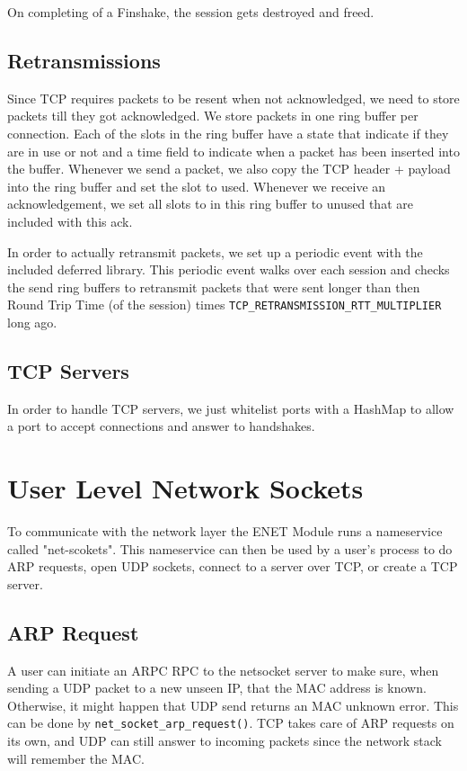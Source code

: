 On completing of a Finshake, the session gets destroyed and freed.

\subsection{Retransmissions}

Since TCP requires packets to be resent when not acknowledged, we need to store packets till they got acknowledged. We store packets in one ring buffer per connection. Each of the slots in the ring buffer have a state that indicate if they are in use or not and a time field to indicate when a packet has been inserted into the buffer. Whenever we send a packet, we also copy the TCP header + payload into the ring buffer and set the slot to used. Whenever we receive an acknowledgement, we set all slots to in this ring buffer to unused that are included with this ack. 

In order to actually retransmit packets, we set up a periodic event with the included deferred library. This periodic event walks over each session and checks the send ring buffers to retransmit packets that were sent longer than then Round Trip Time (of the session) times \texttt{TCP_RETRANSMISSION_RTT_MULTIPLIER} long ago.

\subsection{TCP Servers}
In order to handle TCP servers, we just whitelist ports with a HashMap to allow a port to accept connections and answer to handshakes.



\section{User Level Network Sockets}

To communicate with the network layer the ENET Module runs a nameservice called "net-scokets". This nameservice can then be used by a user's process to do ARP requests, open UDP sockets, connect to a server over TCP, or create a TCP server.  

\subsection{ARP Request}

A user can initiate an ARPC RPC to the netsocket server to make sure, when sending a UDP packet to a new unseen IP, that the MAC address is known. Otherwise, it might happen that UDP send returns an MAC unknown error. This can be done by \texttt{net_socket_arp_request()}. TCP takes care of ARP requests on its own, and UDP can still answer to incoming packets since the network stack will remember the MAC.

